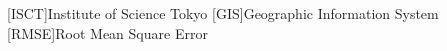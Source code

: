 
\begin{acronym}[RMSE]          %
  [ISCT]{Institute of Science Tokyo}
  [GIS]{Geographic Information System}
  [RMSE]{Root Mean Square Error}
\end{acronym}
